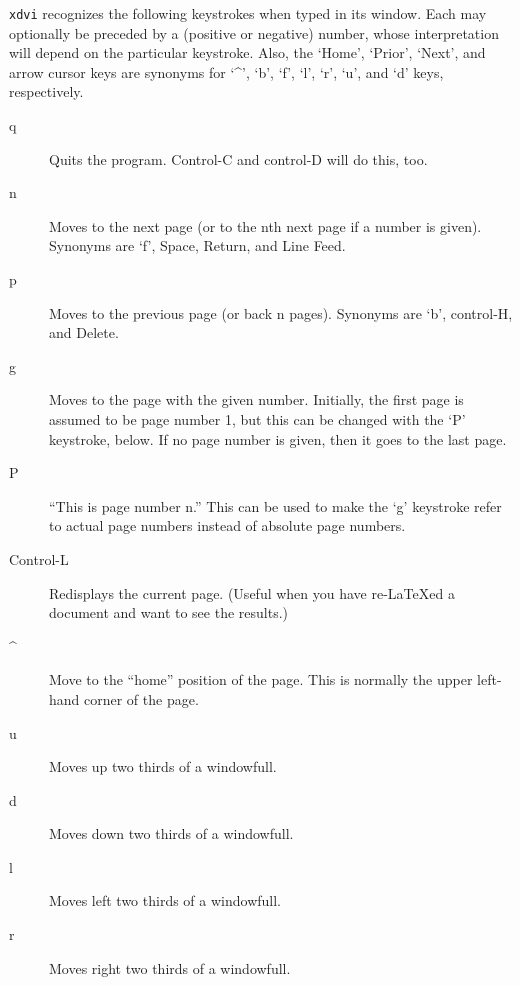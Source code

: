 \documentclass[a4paper,12pt]{article}
\begin{document}
\begin{table}
\noindent     \texttt{xdvi} recognizes the following keystrokes when typed  in  its
     window.   Each  may optionally be preceded by a (positive or
     negative) number, whose interpretation will  depend  on  the
     particular  keystroke.   Also,  the `Home', `Prior', `Next',
     and arrow cursor keys are synonyms for `\^{ }', `b',  `f',  `l',
     `r', `u', and `d' keys, respectively.

\begin{description} 
\item[q]    Quits the program.  Control-C  and  control-D  will  do
          this, too.
 
\item[n]    Moves to the next page (or to the nth next  page  if  a
          number is given).  Synonyms are `f', Space, Return, and
          Line Feed.
 
\item[p]    Moves to the previous page (or back n pages).  Synonyms
          are `b', control-H, and Delete.
 
\item[g]    Moves to the page with the  given  number.   Initially,
          the first page is assumed to be page number 1, but this
          can be changed with the `P' keystroke,  below.   If  no
          page number is given, then it goes to the last page.
 
\item[P]    ``This is page number n.''  This can be  used  to  make
          the  `g' keystroke refer to actual page numbers instead
          of absolute page numbers.
 
\item[Control-L] Redisplays the current page. (Useful when you have
re-\LaTeX ed a document and want to see the results.)
 
\item[\^{ }]    Move to the ``home'' position of  the  page.   This  is
          normally  the  upper  left-hand  corner  of  the  page.
 
\item[u]    Moves up two thirds of a windowfull.
 
\item[d]    Moves down two thirds of a windowfull.
 
\item[l]    Moves left two thirds of a windowfull.
 
\item[r]    Moves right two thirds of a windowfull.
 

\end{description}
\end{table}
\end{document}
